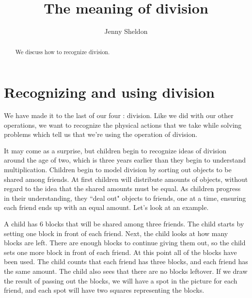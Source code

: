 \documentclass{ximera}
\title{The meaning of division}
\author{Jenny Sheldon}
\begin{document}
\begin{abstract}
We discuss how to recognize division.
\end{abstract}
\maketitle






\section{Recognizing and using division}
We have made it to the last of our four : division. Like we did with our other operations, we want to recognize the physical actions that we take while solving problems which tell us that we're using the operation of division. 

It may come as a surprise, but children begin to recognize ideas of division around the age of two, which is three years earlier than they begin to understand multiplication. Children begin to model division by sorting out objects to be shared among friends. At first children will distribute amounts of objects, without regard to the idea that the shared amounts must be equal. As children progress in their understanding, they ``deal out" objects to friends, one at a time, ensuring each friend ends up with an equal amount. Let's look at an example.

A child has 6 blocks that will be shared among three friends. The child starts by setting one block in front of each friend. Next, the child looks at how many blocks are left. There are enough blocks to continue giving them out, so the child sets one more block in front of each friend. At this point all of the blocks have been used. The child counts that each friend has three blocks, and each friend has the same amount. The child also sees that there are no blocks leftover. If we draw the result of passing out the blocks, we will have a spot in the picture for each friend, and each spot will have two squares representing the blocks.
\begin{image}
\end{image}
\end{document}
